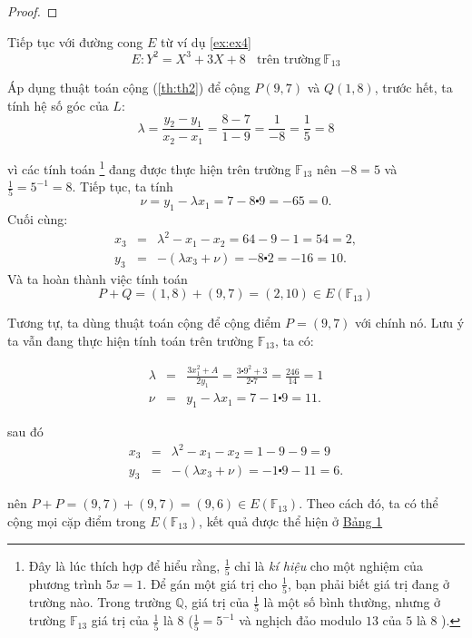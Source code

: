 \begin{proof}

\end{proof}

\begin{example}
	\label{ex:ex5}
	Tiếp tục với đường cong $E$ từ ví dụ \ref{ex:ex4}
	$$ E: Y^2 = X^3 + 3X + 8 \ \ \ \ \text{trên trường}\  \mathbb{F}_{13} $$
\end{example}
Áp dụng thuật toán cộng (\ref{th:th2}) để cộng $P(9,7)$ và $Q(1,8)$, trước hết, ta tính hệ số góc của $L$:
$$\lambda  =\frac{y_2-y_1}{x_2-x_1} = \frac{8-7}{1-9} = \frac{1}{-8} = \frac{1}{5} = 8$$

vì các tính toán \footnote{Đây là lúc thích hợp để hiểu rằng, $\frac{1}{5}$ chỉ là \textit{kí hiệu} cho một nghiệm của phương trình $5x=1$.
	Để gán một giá trị cho $\frac{1}{5}$, bạn phải biết giá trị đang ở trường nào. Trong trường $\mathbb{Q}$, giá trị của $\frac{1}{5}$ là một số bình thường,
	nhưng ở trường $\mathbb{F}_{13}$ giá trị của $\frac{1}{5}$ là $8$ ($\frac{1}{5} = 5^{-1}$ và nghịch đảo modulo $13$ của $5$ là $8$ ).} đang được thực hiện trên trường $\mathbb{F}_{13}$ nên $-8 = 5$ và $\frac{1}{5} = 5^{-1} = 8$.
Tiếp tục, ta tính
$$\nu = y_1 - \lambda x_1 = 7 - 8 \centerdot 9 = -65 = 0.$$
Cuối cùng:
$$
	\begin{array}{rcl}
		x_3 & = & \lambda^2 - x_1 - x_2 = 64 -9 -1 = 54 = 2,         \\
		y_3 & = & -(\lambda x_3 + \nu) = -8 \centerdot 2 = -16 = 10.
	\end{array}
$$
Và ta hoàn thành việc tính toán
$$P+Q = (1,8) + (9,7) = (2,10) \in E(\mathbb{F}_{13})$$

Tương tự, ta dùng thuật toán cộng để cộng điểm $P = (9,7)$ với chính nó. Lưu ý ta vẫn đang thực hiện tính toán trên trường $\mathbb{F}_{13}$, ta có:

$$
	\begin{array}{rcl}
		\lambda & = & \frac{3x_1^2+A}{2y_1} = \frac{3\centerdot 9^ 2 + 3}{2 \centerdot 7} = \frac{246}{14} = 1 \\
		\nu     & = & y_1-\lambda x_1 = 7 - 1 \centerdot 9 = 11 .
	\end{array}
$$

sau đó
$$
	\begin{array}{rcl}
		x_3 & = & \lambda^2 - x_1 - x_2 = 1 - 9 - 9 = 9          \\
		y_3 & = & -(\lambda x_3 + \nu) = -1 \centerdot 9 -11 =6.
	\end{array}
$$

nên $P+P = (9,7) + (9,7) = (9,6) \in E(\mathbb{F}_{13})$. Theo cách đó, ta có thể cộng mọi cặp điểm trong $E(\mathbb{F}_{13})$, kết quả được thể hiện ở \hyperref[fg:tb1]{Bảng 1}



